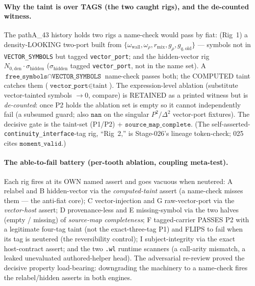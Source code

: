 \paragraph{Why the taint is over TAGS (the two caught rigs), and the de-counted witness.}
The pathA\_43 history holds two rigs a name-check would pass by fiat: (Rig~1) a density-LOOKING two-port
built from \(\{\omega_{\mathrm{wall}},\omega_\rho,r_{\mathrm{mix}},g_\rho,g_{q,\mathrm{old}}\}\) --- symbols
not in \texttt{VECTOR\_SYMBOLS} but tagged \texttt{vector\_port}; and the hidden-vector rig
\(N_{0,\mathrm{den}}\cdot\sigma_{\mathrm{hidden}}\) (\(\sigma_{\mathrm{hidden}}\) tagged \texttt{vector\_port},
not in the name set). A \(\texttt{free\_symbols}\cap\texttt{VECTOR\_SYMBOLS}\) name-check passes both; the
COMPUTED taint catches them (\(\texttt{vector\_port}\in\text{taint}\)). The expression-level ablation
(substitute vector-tainted symbols \(\to0\), compare) is RETAINED as a printed witness but is
\emph{de-counted}: once P2 holds the ablation set is empty so it cannot independently fail (a subsumed
guard; also \(\texttt{nan}\) on the singular \(P^2/\Delta^2\) vector-port fixtures). The decisive gate is
the taint-set (P1/P2) + \(\texttt{source\_map\_complete}\). (The self-asserted-\texttt{continuity\_interface}-tag
rig, ``Rig~2,'' is Stage-026's lineage token-check; 025 cites \(\texttt{moment\_valid}\).)

\paragraph{The able-to-fail battery (per-tooth ablation, coupling meta-test).}
Each rig fires at its OWN named assert and goes vacuous when neutered: A relabel and B hidden-vector via
the \emph{computed-taint} assert (a name-check misses them --- the anti-fiat core); C vector-injection and
G raw-vector-port via the \emph{vector-host} assert; D provenance-less and E missing-symbol via the two
halves (empty / missing) of \emph{source-map completeness}; F tagged-carrier PASSES P2 with a legitimate
four-tag taint (not the exact-three-tag P1) and FLIPS to fail when its tag is neutered (the reversibility
control); I subject-integrity via the exact host-contract assert; and the two \texttt{.wl} runtime scanners
(a call-arity mismatch, a leaked unevaluated authored-helper head). The adversarial re-review proved the
decisive property load-bearing: downgrading the machinery to a name-check fires the relabel/hidden asserts
in both engines.

